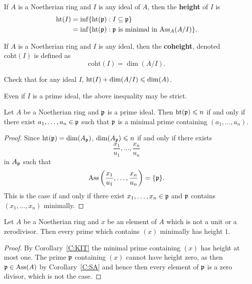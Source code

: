 \documentclass{ximera}
\begin{document}
\begin{definition}
  If $A$ is a Noetherian ring and $I$ is any ideal of $A$, then the \textbf{height} of $I$ is 
  \begin{align*}
    \operatorname{ht}(I) &= \inf\{\operatorname{ht}(\mathfrak{p}): I\subseteq\mathfrak{p}\} \\
    &= \inf\{\operatorname{ht}(\mathfrak{p}): \mathfrak{p} \text{ is minimal in $\operatorname{Ass}_A(A/I)$}\}.
  \end{align*}
\end{definition}

\begin{definition}
  If $A$ is a Noetherian ring and $I$ is any ideal, then the \textbf{coheight}, denoted $\mathrm{coht}(I)$ is defined as 
  \[
  \mathrm{coht}(I) = \dim(A/I).
  \]
\end{definition}

\begin{exercise}
  Check that for any ideal $I$, $\operatorname{ht}(I)+\dim(A/I)\leqslant\dim(A)$. 
\end{exercise}

\begin{warning}
  Even if $I$ is a prime ideal, the above inequality may be strict.
\end{warning}

\begin{corollary}\label{C:KIT}
  Let $A$ be a Noetherian ring and $\mathfrak{p}$ is a prime ideal.  Then
  $\operatorname{ht}(\mathfrak{p})\leqslant n$ if and only if there exist $a_1,\dots,a_n\in\mathfrak{p}$ such
  that $\mathfrak{p}$ is a minimal prime containing $(a_1,\dots,a_n)$.
  \begin{proof}
    Since $\operatorname{ht}(\mathfrak{p}) = \dim(A_{\mathfrak{p}})$, $\dim(A_{\mathfrak{p}})\leqslant n$ if and only if there exists 
    \[
    \frac{x_1}{u_1}, \dots, \frac{x_n}{u_n}
    \]
    in $A_{\mathfrak{p}}$ such that 
    \[
    \operatorname{Ass}\left(\frac{x_1}{u_1}, \dots, \frac{x_n}{u_n}\right) = \{\mathfrak{p}\}.
    \]
    This is the case if and only if there exist $x_1,\dots, x_n\in \mathfrak{p}$
    and $\mathfrak{p}$ contains $(x_1,\dots,x_n)$ minimally.
  \end{proof}
\end{corollary}


\begin{corollary}
  Let $A$ be a Noetherian ring and $x$ be an element of $A$ which is
  not a unit or a zerodivisor. Then every prime which contains $(x)$
  minimally has height $1$.
  \begin{proof}
    By Corollary~\ref{C:KIT} the minimal prime containing $(x)$ has
    height at most one. The prime $\mathfrak{p}$ containing $(x)$ cannot have
    height zero, as then $\mathfrak{p}\in\operatorname{Ass}(A)$ by Corollary~\ref{C:SA} and
    hence then every element of $\mathfrak{p}$ is a zero divisor, which is not
    the case.
  \end{proof}
\end{corollary}
\end{document}
